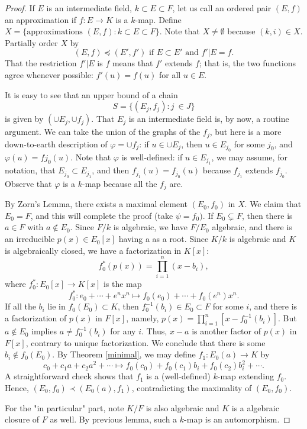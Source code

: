 \documentclass[12pt]{report}
\theoremstyle{definition}
\begin{document}
\begin{proof}
    If $E$ is an intermediate field, $k \subset  E \subset  F$, let us call an ordered pair $(E, f)$ an approximation if $f : E \to K$ is a $k$-map. Define $X = \{\mbox{approximations } (E, f) : k \subset  E \subset  F\}$. Note that $X \not= \emptyset$ because $(k, i) \in X$. Partially order $X$ by $$(E, f) \preceq (E', f') \mbox{ if } E \subset E' \mbox{ and } f'|E = f.$$
    That the restriction $f'|E$ is $f$ means that $f'$ extends $f$; that is, the two functions agree whenever possible: $f'(u) = f(u)$ for all $u \in E$.

    It is easy to see that an upper bound of a chain $$S = \{(E_j, f_j) : j\ \in J\}$$ is given by $(\cup E_j,\cup f_j)$. That $E_j$ is an intermediate field is, by now, a routine argument. We can take the union of the graphs of the $f_j$, but here is a more down-to-earth description of $\varphi =\cup f_j$: if $u \in \cup E_j$, then $u \in E_{j_0}$ for some $j_0$, and $\varphi(u)= fj_0 (u)$. Note that $\varphi$ is well-defined: if $u \in E_{j_1}$, we may assume, for notation, that $E_{j_0} \subset  E_{j_1}$, and then $f_{j_1} (u) = f_{j_0} (u)$ because $f_{j_1}$ extends $f_{j_0}$. Observe that $\varphi$ is a $k$-map because all the $f_j$ are.
    
    By Zorn's Lemma, there exists a maximal element $(E_0, f_0)$ in $X$. We claim that $E_0 = F$, and this will complete the proof (take $\psi  = f_0)$. If $E_0 \subsetneq F$, then there is $a \in F$ with $a \notin E_0$. Since $F/k$ is algebraic, we have $F/E_0$ algebraic, and there is an irreducible $p(x) \in E_0[x]$ having a as a root. Since $K/k$ is algebraic and $K$ is algebraically closed, we have a factorization in $K[x]$: $$f_0^*(p(x)) = \prod_{i=1}^n(x-b_i),$$ where $f_0^*: E_0[x] \to K[x]$ is the map $$f^*_0 : e_0 + \cdots + e^nx^n \mapsto f_0(e_0) +\cdots + f_0(e^n)x^n.$$ If all the $b_i$ lie in $f_0(E_0) \subset K$, then $f^{-1}_0 (b_i) \in E_0 \subset  F$ for some $i$, and there is a factorization of $p(x)$ in $F[x]$, namely, $p(x) =\prod_{i=1}^n[x - f^{-1}_0 (b_i)]$. But $a \notin E_0$ implies $a \not= f^{-1}_0 (b_i)$ for any $i$. Thus, $x - a$ is another factor of $p(x)$ in $F[x]$, contrary to unique factorization. We conclude that there is some $b_i \notin f_0(E_0)$. By Theorem \ref{minimal}, we may define $f_1 : E_0(a) \to K$ by $$c_0 + c_1a + c_2a^2 +\cdots \mapsto f_0(c_0) + f_0(c_1)b_i + f_0(c_2)b^2_i+\cdots .$$ A straightforward check shows that $f_1$ is a (well-defined) $k$-map extending $f_0$. Hence, $(E_0, f_0) \prec (E_0(a), f_1)$, contradicting the maximality of $(E_0, f_0)$. 

    For the "in particular" part, note $K/F$ is also algebraic and $K$ is a algebraic closure of $F$ as well. By previous lemma, such a $k$-map is an automorphism.
\end{proof}
\end{document}
